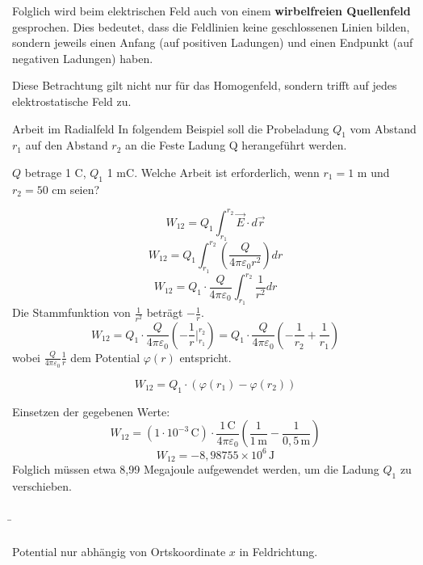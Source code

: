 \begin{frame}
{	Folglich wird beim elektrischen Feld auch von einem \textbf{wirbelfreien Quellenfeld} gesprochen.
	Dies bedeutet, dass die Feldlinien keine geschlossenen Linien bilden, sondern jeweils einen Anfang (auf positiven Ladungen)
	und einen Endpunkt (auf negativen Ladungen) haben.
	
	Diese Betrachtung gilt nicht nur für das Homogenfeld, sondern trifft auf jedes elektrostatische Feld zu.



	
	


	\begin{bsp}{Arbeit im Radialfeld}{}
		In folgendem Beispiel soll die Probeladung $Q_1$ vom Abstand $r_1$ auf den Abstand $r_2$ an die Feste Ladung Q herangeführt werden.

		\begin{center}
			
		\end{center}

		
		
		

		$Q$ betrage 1 C, $Q_1$ 1 mC. Welche Arbeit ist erforderlich, wenn $r_1 = 1$ m und $r_2 = 50$ cm seien?

		\[
W_{12} = Q_1 \int_{r_1}^{r_2} \vec{E} \cdot d\vec{r}
\]
\[
W_{12} = Q_1 \int_{r_1}^{r_2} \left( \frac{Q}{4 \pi \varepsilon_0 r^2} \right) dr
\]
\[
W_{12} = Q_1 \cdot \frac{Q}{4 \pi \varepsilon_0} \int_{r_1}^{r_2} \frac{1}{r^2} dr
\]
Die Stammfunktion von $\frac{1}{r^2}$ beträgt $-\frac{1}{r}$.
\[
W_{12} = Q_1 \cdot \frac{Q}{4 \pi \varepsilon_0} \left( -\frac{1}{r} \bigg|_{r_1}^{r_2} \right) = Q_1 \cdot \frac{Q}{4 \pi \varepsilon_0} \left( -\frac{1}{r_2} + \frac{1}{r_1} \right)
\]
wobei $\frac{Q}{4 \pi \varepsilon_0} \frac{1}{r}$ dem Potential $\varphi(r)$ entspricht.

\[
W_{12} = Q_1 \cdot (\varphi(r_1) - \varphi(r_2))
\]

Einsetzen der gegebenen Werte:
\[
W_{12} = (1 \cdot 10^{-3} \, \text{C}) \cdot \frac{1 \, \text{C}}{4 \pi \varepsilon_0} \left( \frac{1}{1 \, \text{m}} - \frac{1}{0{,}5 \, \text{m}} \right)
\]
\[
W_{12} = -8,98755 \times 10^{6} \, \text{J}
\]
Folglich müssen etwa 8,99 Megajoule aufgewendet werden, um die Ladung $Q_1$ zu verschieben. 
	\end{bsp}	


	}

	\b{

	\begin{columns}
		Potential nur abhängig von Ortskoordinate $x$ in Feldrichtung.


\end{columns}}
\end{frame}
